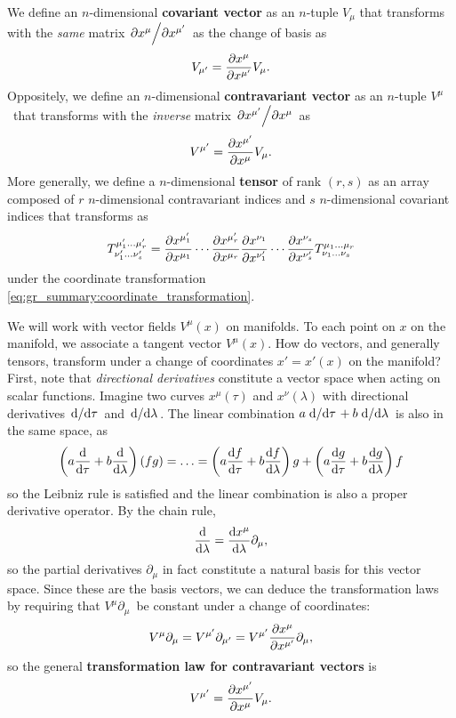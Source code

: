 We define an $n$-dimensional \textbf{covariant vector} as an $n$-tuple $V_\mu$ that transforms with the \emph{same} matrix $\pdv{x^{\mu}}/{x^{\mu'}}$ as the change of basis as
\begin{equation}
	V_{\mu'} = \pdv{x^{\mu}}{x^{\mu'}} V_\mu .
	\label{eq:covariant_transformation}
\end{equation}
Oppositely, we define an $n$-dimensional \textbf{contravariant vector} as an $n$-tuple $V^\mu$ that transforms with the \emph{inverse} matrix $\pdv{x^{\mu'}}/{x^{\mu}}$ as
\begin{equation}
	V^{\mu'} = \pdv{x^{\mu'}}{x^\mu} V_\mu .
	\label{eq:contravariant_transformation}
\end{equation}
More generally, we define a $n$-dimensional \textbf{tensor} of rank $(r,s)$ as an array composed of $r$ $n$-dimensional contravariant indices and $s$ $n$-dimensional covariant indices that transforms as
\begin{equation}
	T^{\mu_1' \dots \mu_r'}_{\nu_1' \dots \nu_s'} = \pdv{x^{\mu_1'}}{x^{\mu_1}} \cdots \pdv{x^{\mu_r'}}{x^{\mu_r}}
	                                                \pdv{x^{\nu_1}}{x^{\nu_1'}} \cdots \pdv{x^{\nu_s}}{x^{\nu_s'}}
												    T^{\mu_1 \dots \mu_r}_{\nu_1 \dots \nu_s}
	\label{eq:tensor_transformation}
\end{equation}
under the coordinate transformation \eqref{eq:gr_summary:coordinate_transformation}.

\iffalse
We will work with vector fields $V^\mu(x)$ on manifolds.
To each point on $x$ on the manifold, we associate a tangent vector $V^\mu(x)$.
How do vectors, and generally tensors, transform under a change of coordinates $x' = x'(x)$ on the manifold?
First, note that \emph{directional derivatives} constitute a vector space when acting on scalar functions.
Imagine two curves $x^\mu(\tau)$ and $x^\nu(\lambda)$ with directional derivatives $\odv{}/{\tau}$ and $\odv{}/{\lambda}$.
The linear combination $a \odv{}/{\tau} + b \odv{}/{\lambda}$ is also in the same space, as
\begin{equation}
	\lincombo{}(fg) = \ldots = \lincombo{f} g + \lincombo{g} f
\end{equation}
so the Leibniz rule is satisfied and the linear combination is also a proper derivative operator.
By the chain rule,
\begin{equation}
	\odv{}{\lambda} = \odv{x^\mu}{\lambda} \partial_\mu ,
\end{equation}
so the partial derivatives $\partial_\mu$ in fact constitute a natural basis for this vector space.
Since these are the basis vectors, we can deduce the transformation laws by requiring that $V^\mu \partial_\mu$ be constant under a change of coordinates:
\begin{equation}
	V^\mu \partial_\mu = V^{\mu'} \partial_{\mu'} = V^{\mu'} \pdv{x^\mu}{x^{\mu'}} \partial_\mu ,
\end{equation}
so the general \textbf{transformation law for contravariant vectors} is
\begin{equation}
	V^{\mu'} = \pdv{x^{\mu'}}{x^\mu} V_\mu .
\end{equation}

